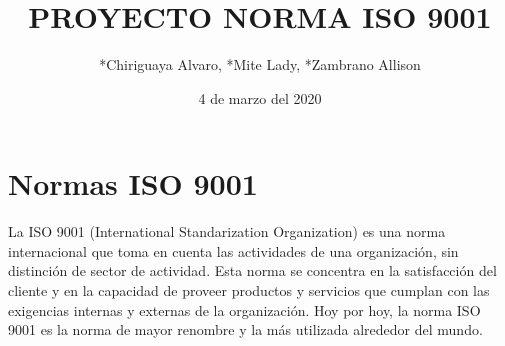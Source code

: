 \documentclass[12pt,a4paper]{article}
\title{PROYECTO NORMA ISO 9001}
\author{*Chiriguaya Alvaro, *Mite Lady, *Zambrano Allison}
\date{4 de marzo del 2020}
\begin{document}

\section{Normas ISO 9001}
La ISO 9001 (International Standarization Organization) es una norma internacional que toma en cuenta las actividades de una organización, sin distinción de sector de actividad. Esta norma se concentra en la satisfacción del cliente y en la capacidad de proveer productos y servicios que cumplan con las exigencias internas y externas de la organización. Hoy por hoy, la norma ISO 9001 es la norma de mayor renombre y la más utilizada alrededor del mundo.
\end{document}
